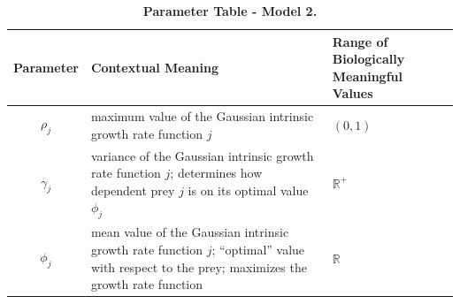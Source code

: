 \documentclass{amsart}
\theoremstyle{definition}
\theoremstyle{remark}
\numberwithin{equation}{section}
\begin{document}
\begin{table}[h]
	\label{parameter_table_model_2}
    \begin{tabular}{||c|L{7cm}|L{2.5cm}||}\hline\hline
    {\bf Parameter} & {\bf Contextual Meaning} & {\bf Range of Biologically Meaningful Values} \\\hline\hline
    $\rho_j$ & maximum value of the Gaussian intrinsic growth rate function $j$ & $(0, 1)$ \\\hline
    $\gamma_j$ & variance of the Gaussian intrinsic growth rate function $j$; determines how dependent prey $j$ is on its optimal value $\phi_j$ & $\mathbb{R}^{+}$ \\\hline
    $\phi_j$ & mean value of the Gaussian intrinsic growth rate function $j$; ``optimal'' value with respect to the prey; maximizes the growth rate function & $\mathbb{R}$ \\\hline\hline
    \end{tabular}
    \caption{\footnotesize{\bf Parameter Table - Model 2.}}
\end{table}
\end{document}

